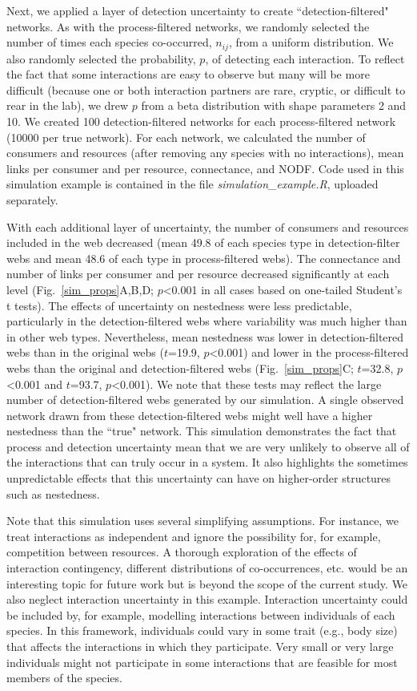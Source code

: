 \documentclass[12pt]{article}
\begin{document}
  Next, we applied a layer of detection uncertainty to create ``detection-filtered" networks. As with the process-filtered networks, we randomly selected the number of times each species co-occurred, $n_{ij}$, from a uniform distribution. We also randomly selected the probability, $p$, of detecting each interaction. To reflect the fact that some interactions are easy to observe but many will be more difficult (because one or both interaction partners are rare, cryptic, or difficult to rear in the lab), we drew $p$ from a beta distribution with shape parameters 2 and 10. We created 100 detection-filtered networks for each process-filtered network (10000 per true network). For each network, we calculated the number of consumers and resources (after removing any species with no interactions), mean links per consumer and per resource, connectance, and NODF. Code used in this simulation example is contained in the file \emph{simulation\_example.R}, uploaded separately.


  With each additional layer of uncertainty, the number of consumers and resources included in the web decreased (mean 49.8 of each species type in detection-filter webs and mean 48.6 of each type in process-filtered webs). The connectance and number of links per consumer and per resource decreased significantly at each level (Fig.~\ref{sim_props}A,B,D; $p$\textless0.001 in all cases based on one-tailed Student's t tests). The effects of uncertainty on nestedness were less predictable, particularly in the detection-filtered webs where variability was much higher than in other web types. Nevertheless, mean nestedness was lower in detection-filtered webs than in the original webs ($t$=19.9, $p$\textless0.001) and lower in the process-filtered webs than the original and detection-filtered webs (Fig.~\ref{sim_props}C; $t$=32.8, $p$\textless0.001 and $t$=93.7, $p$\textless0.001). We note that these tests may reflect the large number of detection-filtered webs generated by our simulation. A single observed network drawn from these detection-filtered webs might well have a higher nestedness than the ``true" network. This simulation demonstrates the fact that process and detection uncertainty mean that we are very unlikely to observe all of the interactions that can truly occur in a system. It also highlights the sometimes unpredictable effects that this uncertainty can have on higher-order structures such as nestedness.


  Note that this simulation uses several simplifying assumptions. For instance, we treat interactions as independent and ignore the possibility for, for example, competition between resources. A thorough exploration of the effects of interaction contingency, different distributions of co-occurrences, etc. would be an interesting topic for future work but is beyond the scope of the current study. We also neglect interaction uncertainty in this example. Interaction uncertainty could be included by, for example, modelling interactions between individuals of each species. In this framework, individuals could vary in some trait (e.g., body size) that affects the interactions in which they participate. Very small or very large individuals might not participate in some interactions that are feasible for most members of the species. 
\end{document}
